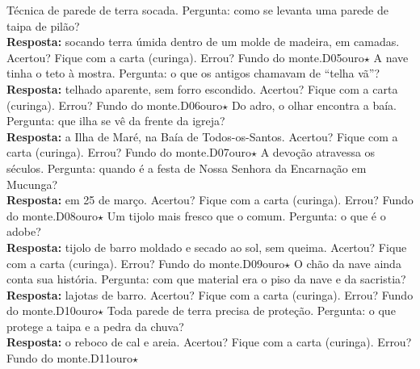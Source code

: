 \linhacartas
{
{Técnica de parede de terra socada.}
{Pergunta: como se levanta uma parede de taipa de pilão?\\ \textbf{Resposta:} socando terra úmida dentro de um molde de madeira, em camadas.}
{Acertou? Fique com a carta (curinga). Errou? Fundo do monte.}{D05}{ouro}{$\star$}}
{
{A nave tinha o teto à mostra.}
{Pergunta: o que os antigos chamavam de ``telha vã''?\\ \textbf{Resposta:} telhado aparente, sem forro escondido.}
{Acertou? Fique com a carta (curinga). Errou? Fundo do monte.}{D06}{ouro}{$\star$}}
{
{Do adro, o olhar encontra a baía.}
{Pergunta: que ilha se vê da frente da igreja?\\ \textbf{Resposta:} a Ilha de Maré, na Baía de Todos-os-Santos.}
{Acertou? Fique com a carta (curinga). Errou? Fundo do monte.}{D07}{ouro}{$\star$}}
\linhacartas
{
{A devoção atravessa os séculos.}
{Pergunta: quando é a festa de Nossa Senhora da Encarnação em Mucunga?\\ \textbf{Resposta:} em 25 de março.}
{Acertou? Fique com a carta (curinga). Errou? Fundo do monte.}{D08}{ouro}{$\star$}}
{
{Um tijolo mais fresco que o comum.}
{Pergunta: o que é o adobe?\\ \textbf{Resposta:} tijolo de barro moldado e secado ao sol, sem queima.}
{Acertou? Fique com a carta (curinga). Errou? Fundo do monte.}{D09}{ouro}{$\star$}}
{
{O chão da nave ainda conta sua história.}
{Pergunta: com que material era o piso da nave e da sacristia?\\ \textbf{Resposta:} lajotas de barro.}
{Acertou? Fique com a carta (curinga). Errou? Fundo do monte.}{D10}{ouro}{$\star$}}
\linhacartas
{
{Toda parede de terra precisa de proteção.}
{Pergunta: o que protege a taipa e a pedra da chuva?\\ \textbf{Resposta:} o reboco de cal e areia.}
{Acertou? Fique com a carta (curinga). Errou? Fundo do monte.}{D11}{ouro}{$\star$}}
